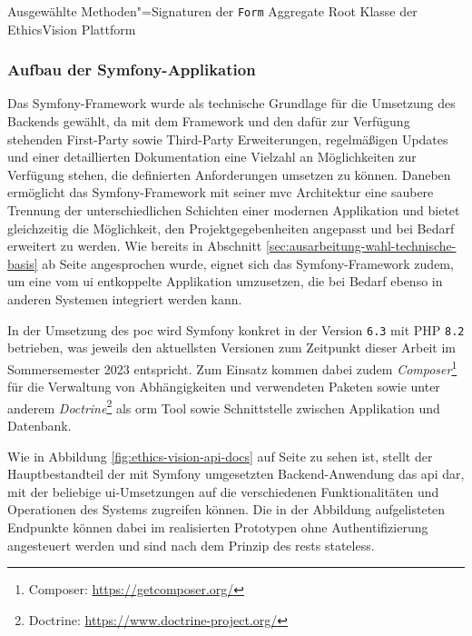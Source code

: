 \documentclass[a4paper,12pt,twoside,numbers=noendperiod]{scrreprt}
\begin{document}
\begin{listing}[ht]
    \inputminted[fontsize=\footnotesize,linenos,xleftmargin=8mm]{php}{code/Luidold_Form-Aggregate-Root.php}
    \caption{Ausgewählte Methoden"=Signaturen der \texttt{Form} Aggregate Root Klasse der EthicsVision Plattform}
    \label{code:form-aggregate-root}
\end{listing}

\subsubsection*{Aufbau der Symfony-Applikation}
\label{sub-sub-sec:aufbau-symfony-applikation}

Das Symfony-Framework wurde als technische Grundlage für die Umsetzung des Backends gewählt, da mit dem Framework und den dafür zur Verfügung stehenden First-Party sowie Third-Party Erweiterungen, regelmäßigen Updates und einer detaillierten Dokumentation eine Vielzahl an Möglichkeiten zur Verfügung stehen, die definierten Anforderungen umsetzen zu können. Daneben ermöglicht das Symfony-Framework mit seiner \acl{mvc} Architektur eine saubere Trennung der unterschiedlichen Schichten einer modernen Applikation und bietet gleichzeitig die Möglichkeit, den Projektgegebenheiten angepasst und bei Bedarf erweitert zu werden. Wie bereits in Abschnitt \ref{sec:ausarbeitung-wahl-technische-basis} ab Seite \pageref{sec:ausarbeitung-wahl-technische-basis} angesprochen wurde, eignet sich das Symfony-Framework zudem, um eine vom \acl{ui} entkoppelte Applikation umzusetzen, die bei Bedarf ebenso in anderen Systemen integriert werden kann. \cite{symfony_sas_six-reasons_2023, kszczanowicz_why_2021} 

In der Umsetzung des \ac{poc} wird Symfony konkret in der Version \texttt{6.3} mit PHP \texttt{8.2} betrieben, was jeweils den aktuellsten Versionen zum Zeitpunkt dieser Arbeit im Sommersemester 2023 entspricht. Zum Einsatz kommen dabei zudem \textit{Composer}\footnote{Composer: \url{https://getcomposer.org/}} für die Verwaltung von Abhängigkeiten und verwendeten Paketen sowie unter anderem \textit{Doctrine}\footnote{Doctrine: \url{https://www.doctrine-project.org/}} als \ac{orm} Tool sowie Schnittstelle zwischen Applikation und Datenbank.

\medskip

Wie in Abbildung \ref{fig:ethics-vision-api-docs} auf Seite \pageref{fig:ethics-vision-api-docs} zu sehen ist, stellt der Hauptbestandteil der mit Symfony umgesetzten Backend-Anwendung das \ac{api} dar, mit der beliebige \ac{ui}-Umsetzungen auf die verschiedenen Funktionalitäten und Operationen des Systems zugreifen können. Die in der Abbildung aufgelisteten Endpunkte können dabei im realisierten Prototypen ohne Authentifizierung angesteuert werden und sind nach dem Prinzip des \acp{rest} stateless. \cite{gupta_stateless_2018}
\end{document}
